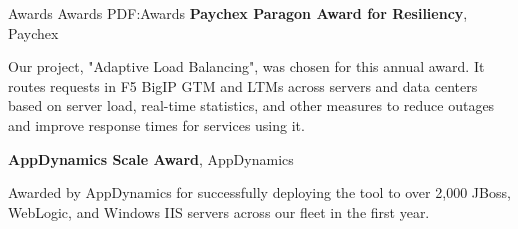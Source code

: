 \documentclass[letterpaper,MMMMyyyy,nonstopmode]{simpleresumecv}
\begin{document}
\begin{Body}
\Section
{Awards}
{Awards}
{PDF:Awards}
\textbf{Paychex Paragon Award for Resiliency}, Paychex
\hfill
{}
\begin{Detail}
Our project, "Adaptive Load Balancing", was chosen for this annual award. 
It routes requests in F5 BigIP GTM and LTMs across servers and data centers based on server load, real-time statistics, and other measures to reduce outages and improve response times for services using it.
\end{Detail}
\BigGap

\textbf{AppDynamics Scale Award}, AppDynamics
\hfill
{}
\begin{Detail}
Awarded by AppDynamics for successfully deploying the tool to over 2,000 JBoss, WebLogic, and Windows IIS servers across our fleet in the first year.
\end{Detail}


\iffalse
\Section
{Publications}
{Publications}
{PDF:Publications}

\SubSection
{Technical Editor}
{Technical Editor}
{PDF:TechnicalEditor}

\Entry
\href{https://www.amazon.com/Oracle-Certified-Associate-ProgrammerStudy/dp/1849687323}
{Reece, Richard M. \textit{Oracle Certified Associate, Java SE 7 Programmer Study Guide}, Packt Publishing, 2012}

\Gap
\Entry
\href
{https://www.amazon.com/Java-Concurrency-Cookbook-FernandezJavier/dp/1849687889}
{Gonzalez, Javier Fernandez. \textit{Java 7 Concurrency Cookbook}, Packt Publishing, 2012}
\fi




\iffalse
\newpage
\begingroup
\color{red}


\end{Body}
\end{document}
